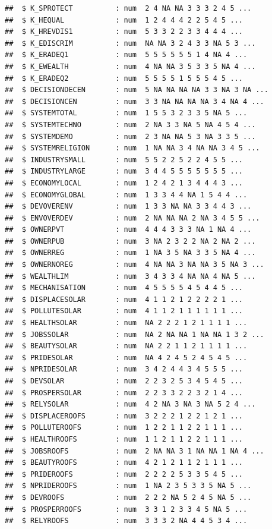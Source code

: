 \documentclass[
]{article}
\begin{document}
\begin{verbatim}
##  $ K_SPROTECT          : num  2 4 NA NA 3 3 3 2 4 5 ...
##  $ K_HEQUAL            : num  1 2 4 4 4 2 2 5 4 5 ...
##  $ K_HREVDIS1          : num  5 3 3 2 2 3 3 4 4 4 ...
##  $ K_EDISCRIM          : num  NA NA 3 2 4 3 3 NA 5 3 ...
##  $ K_ERADEQ1           : num  5 5 5 5 5 5 1 4 NA 4 ...
##  $ K_EWEALTH           : num  4 NA NA 3 5 3 3 5 NA 4 ...
##  $ K_ERADEQ2           : num  5 5 5 5 1 5 5 5 4 5 ...
##  $ DECISIONDECEN       : num  5 NA NA NA NA 3 3 NA 3 NA ...
##  $ DECISIONCEN         : num  3 3 NA NA NA NA 3 4 NA 4 ...
##  $ SYSTEMTOTAL         : num  1 5 5 3 2 3 3 5 NA 5 ...
##  $ SYSTEMTECHNO        : num  2 NA 3 3 NA 5 NA 4 5 4 ...
##  $ SYSTEMDEMO          : num  2 3 NA NA 5 3 NA 3 3 5 ...
##  $ SYSTEMRELIGION      : num  1 NA NA 3 4 NA NA 3 4 5 ...
##  $ INDUSTRYSMALL       : num  5 5 2 2 5 2 2 4 5 5 ...
##  $ INDUSTRYLARGE       : num  3 4 4 5 5 5 5 5 5 5 ...
##  $ ECONOMYLOCAL        : num  1 2 4 2 1 3 4 4 4 3 ...
##  $ ECONOMYGLOBAL       : num  1 3 3 4 4 NA 1 5 4 4 ...
##  $ DEVOVERENV          : num  1 3 3 NA NA 3 3 4 4 3 ...
##  $ ENVOVERDEV          : num  2 NA NA NA 2 NA 3 4 5 5 ...
##  $ OWNERPVT            : num  4 4 4 3 3 3 NA 1 NA 4 ...
##  $ OWNERPUB            : num  3 NA 2 3 2 2 NA 2 NA 2 ...
##  $ OWNERREG            : num  1 NA 3 5 NA 3 3 5 NA 4 ...
##  $ OWNERNOREG          : num  4 NA NA 3 NA NA 3 5 NA 3 ...
##  $ WEALTHLIM           : num  3 4 3 3 4 NA NA 4 NA 5 ...
##  $ MECHANISATION       : num  4 5 5 5 5 4 5 4 4 5 ...
##  $ DISPLACESOLAR       : num  4 1 1 2 1 2 2 2 2 1 ...
##  $ POLLUTESOLAR        : num  4 1 1 2 1 1 1 1 1 1 ...
##  $ HEALTHSOLAR         : num  NA 2 2 2 1 2 1 1 1 1 ...
##  $ JOBSSOLAR           : num  NA 2 NA NA 1 NA NA 1 3 2 ...
##  $ BEAUTYSOLAR         : num  NA 2 2 1 1 2 1 1 1 1 ...
##  $ PRIDESOLAR          : num  NA 4 2 4 5 2 4 5 4 5 ...
##  $ NPRIDESOLAR         : num  3 4 2 4 4 3 4 5 5 5 ...
##  $ DEVSOLAR            : num  2 2 3 2 5 3 4 5 4 5 ...
##  $ PROSPERSOLAR        : num  2 2 3 3 2 2 3 2 1 4 ...
##  $ RELYSOLAR           : num  4 2 NA 3 NA 3 NA 5 2 4 ...
##  $ DISPLACEROOFS       : num  3 2 2 2 1 2 2 1 2 1 ...
##  $ POLLUTEROOFS        : num  1 2 2 1 1 2 2 1 1 1 ...
##  $ HEALTHROOFS         : num  1 1 2 1 1 2 2 1 1 1 ...
##  $ JOBSROOFS           : num  2 NA NA 3 1 NA NA 1 NA 4 ...
##  $ BEAUTYROOFS         : num  4 2 1 2 1 1 2 1 1 1 ...
##  $ PRIDEROOFS          : num  2 2 2 2 5 3 3 5 4 5 ...
##  $ NPRIDEROOFS         : num  1 NA 2 3 5 3 3 5 NA 5 ...
##  $ DEVROOFS            : num  2 2 2 NA 5 2 4 5 NA 5 ...
##  $ PROSPERROOFS        : num  3 3 1 2 3 3 4 5 NA 5 ...
##  $ RELYROOFS           : num  3 3 3 2 NA 4 4 5 3 4 ...

\end{verbatim}
\end{document}
